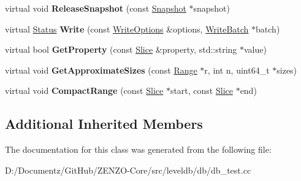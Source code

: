 \begin{DoxyCompactItemize}
\mbox{\label{classleveldb_1_1_model_d_b_a3f5d86ce612baaa88c11601c9a59df12}} 
virtual void {\bfseries Release\+Snapshot} (const \mbox{\hyperlink{classleveldb_1_1_snapshot}{Snapshot}} $\ast$snapshot)
\item 
\mbox{\label{classleveldb_1_1_model_d_b_ae3a20d2fc971376349b142b9c2d159be}} 
virtual \mbox{\hyperlink{classleveldb_1_1_status}{Status}} {\bfseries Write} (const \mbox{\hyperlink{structleveldb_1_1_write_options}{Write\+Options}} \&options, \mbox{\hyperlink{classleveldb_1_1_write_batch}{Write\+Batch}} $\ast$batch)
\item 
\mbox{\label{classleveldb_1_1_model_d_b_a5c83a50a08e45c2564c39a650ea55b86}} 
virtual bool {\bfseries Get\+Property} (const \mbox{\hyperlink{classleveldb_1_1_slice}{Slice}} \&property, std\+::string $\ast$value)
\item 
\mbox{\label{classleveldb_1_1_model_d_b_aeb5502077fae602c5ca3c1153f29b693}} 
virtual void {\bfseries Get\+Approximate\+Sizes} (const \mbox{\hyperlink{structleveldb_1_1_range}{Range}} $\ast$r, int n, uint64\+\_\+t $\ast$sizes)
\item 
\mbox{\label{classleveldb_1_1_model_d_b_a7a04a6e5227079f861c26b920df6b833}} 
virtual void {\bfseries Compact\+Range} (const \mbox{\hyperlink{classleveldb_1_1_slice}{Slice}} $\ast$start, const \mbox{\hyperlink{classleveldb_1_1_slice}{Slice}} $\ast$end)
\end{DoxyCompactItemize}
\subsection*{Additional Inherited Members}


The documentation for this class was generated from the following file\+:\begin{DoxyCompactItemize}
\item 
D\+:/\+Documentz/\+Git\+Hub/\+Z\+E\+N\+Z\+O-\/\+Core/src/leveldb/db/db\+\_\+test.\+cc\end{DoxyCompactItemize}
